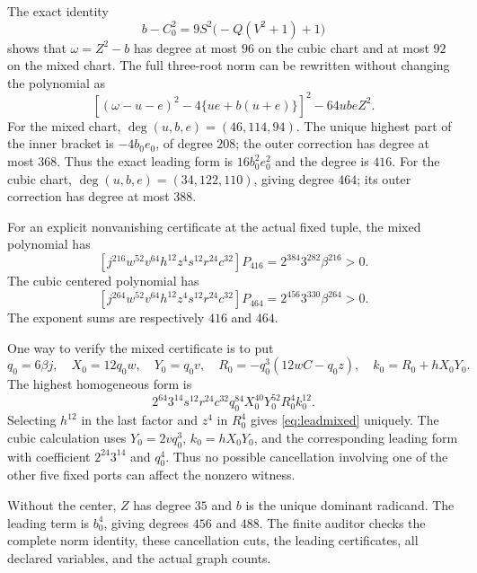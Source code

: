 \documentclass[11pt]{article}
\theoremstyle{definition}
\theoremstyle{remark}
\begin{document}
The exact identity
\begin{equation}\label{eq:cheapcenter}
 b-C_0^2=9S^2\bigl(-Q(V^2+1)+1\bigr)
\end{equation}
shows that $\omega=Z^2-b$ has degree at most $96$ on the cubic
chart and at most $92$ on the mixed chart. The full three-root norm
can be rewritten without changing the polynomial as
\begin{equation}\label{eq:degreecut}
 \left[(\omega-u-e)^2-4\{ue+b(u+e)\}\right]^2
                  -64ubeZ^2.
\end{equation}
For the mixed chart, $\deg(u,b,e)=(46,114,94)$. The unique highest
part of the inner bracket is $-4b_0e_0$, of degree $208$; the outer
correction has degree at most $368$. Thus the exact leading form is
$16b_0^2e_0^2$ and the degree is $416$. For the cubic chart,
$\deg(u,b,e)=(34,122,110)$, giving degree $464$; its outer
correction has degree at most $388$.

For an explicit nonvanishing certificate at the actual fixed tuple,
the mixed polynomial has
\begin{equation}\label{eq:leadmixed}
 [j^{216}w^{52}v^{64}h^{12}z^4s^{12}r^{24}c^{32}]P_{416}
   =2^{384}3^{282}\beta^{216}>0.
\end{equation}
The cubic centered polynomial has
\begin{equation}\label{eq:leadcubic}
 [j^{264}w^{52}v^{64}h^{12}z^4s^{12}r^{24}c^{32}]P_{464}
   =2^{456}3^{330}\beta^{264}>0.
\end{equation}
The exponent sums are respectively $416$ and $464$.

One way to verify the mixed certificate is to put
\[
 q_0=6\beta j,\quad X_0=12q_0w,\quad Y_0=q_0v,
 \quad R_0=-q_0^3(12wC-q_0z),\quad k_0=R_0+hX_0Y_0.
\]
The highest homogeneous form is
\[
 2^{64}3^{14}s^{12}r^{24}c^{32}
 q_0^{84}X_0^{40}Y_0^{52}R_0^4k_0^{12}.
\]
Selecting $h^{12}$ in the last factor and $z^4$ in $R_0^4$ gives
\eqref{eq:leadmixed} uniquely. The cubic calculation uses
$Y_0=2vq_0^3$, $k_0=hX_0Y_0$, and the corresponding leading form
with coefficient $2^{24}3^{14}$ and $q_0^4$. Thus no possible
cancellation involving one of the other five fixed ports can affect
the nonzero witness.

Without the center, $Z$ has degree $35$ and $b$ is the unique
dominant radicand. The leading term is $b_0^4$, giving degrees
$456$ and $488$. The finite auditor checks the complete norm
identity, these cancellation cuts, the leading certificates, all
declared variables, and the actual graph counts.
\end{document}

